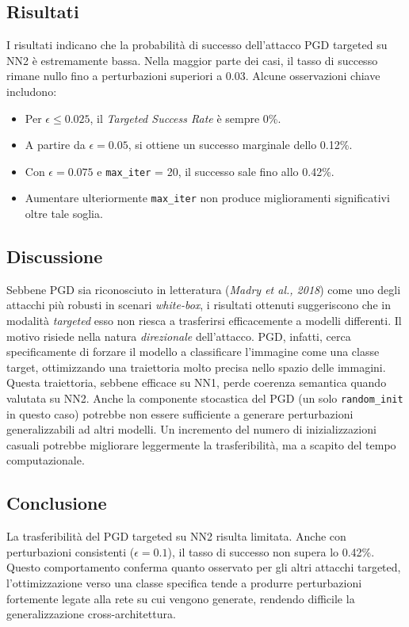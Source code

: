         \subsection{Risultati}
            I risultati indicano che la probabilità di successo dell’attacco PGD targeted su NN2 è estremamente bassa. Nella maggior parte dei casi, il tasso di successo rimane nullo fino a perturbazioni superiori a 0.03. Alcune osservazioni chiave includono:
            
            \begin{itemize}
              \item Per $\epsilon \leq 0.025$, il \textit{Targeted Success Rate} è sempre 0\%.
              \item A partire da $\epsilon = 0.05$, si ottiene un successo marginale dello 0.12\%.
              \item Con $\epsilon = 0.075$ e \texttt{max\_iter} = 20, il successo sale fino allo 0.42\%.
              \item Aumentare ulteriormente \texttt{max\_iter} non produce miglioramenti significativi oltre tale soglia.
            \end{itemize}
            
        \subsection{Discussione}
            Sebbene PGD sia riconosciuto in letteratura (\textit{Madry et al., 2018}) come uno degli attacchi più robusti in scenari \textit{white-box}, i risultati ottenuti suggeriscono che in modalità \textit{targeted} esso non riesca a trasferirsi efficacemente a modelli differenti.
            Il motivo risiede nella natura \textit{direzionale} dell’attacco. PGD, infatti, cerca specificamente di forzare il modello a classificare l'immagine come una classe target, ottimizzando una traiettoria molto precisa nello spazio delle immagini. Questa traiettoria, sebbene efficace su NN1, perde coerenza semantica quando valutata su NN2.
            Anche la componente stocastica del PGD (un solo \texttt{random\_init} in questo caso) potrebbe non essere sufficiente a generare perturbazioni generalizzabili ad altri modelli. Un incremento del numero di inizializzazioni casuali potrebbe migliorare leggermente la trasferibilità, ma a scapito del tempo computazionale.

        \subsection{Conclusione}
            La trasferibilità del PGD targeted su NN2 risulta limitata. Anche con perturbazioni consistenti ($\epsilon = 0.1$), il tasso di successo non supera lo 0.42\%. Questo comportamento conferma quanto osservato per gli altri attacchi targeted, l’ottimizzazione verso una classe specifica tende a produrre perturbazioni fortemente legate alla rete su cui vengono generate, rendendo difficile la generalizzazione cross-architettura.

